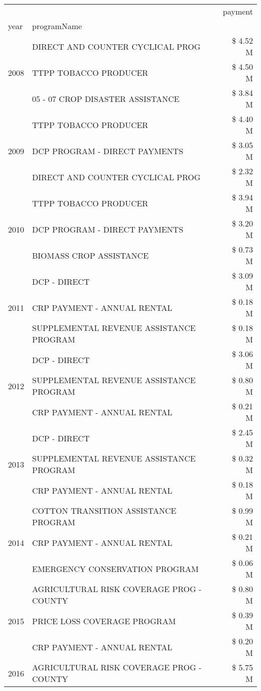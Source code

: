 \begin{tabular}{llr}
\toprule
 &  & payment \\
year & programName &  \\
\midrule
\multirow[t]{3}{*}{2008} & DIRECT AND COUNTER CYCLICAL PROG & \$ 4.52 M \\
 & TTPP TOBACCO PRODUCER & \$ 4.50 M \\
 & 05 - 07 CROP DISASTER ASSISTANCE & \$ 3.84 M \\
\cline{1-3}
\multirow[t]{3}{*}{2009} & TTPP TOBACCO PRODUCER & \$ 4.40 M \\
 & DCP PROGRAM - DIRECT PAYMENTS & \$ 3.05 M \\
 & DIRECT AND COUNTER CYCLICAL PROG & \$ 2.32 M \\
\cline{1-3}
\multirow[t]{3}{*}{2010} & TTPP TOBACCO PRODUCER & \$ 3.94 M \\
 & DCP PROGRAM - DIRECT PAYMENTS & \$ 3.20 M \\
 & BIOMASS CROP ASSISTANCE & \$ 0.73 M \\
\cline{1-3}
\multirow[t]{3}{*}{2011} & DCP - DIRECT & \$ 3.09 M \\
 & CRP PAYMENT - ANNUAL RENTAL & \$ 0.18 M \\
 & SUPPLEMENTAL REVENUE ASSISTANCE PROGRAM & \$ 0.18 M \\
\cline{1-3}
\multirow[t]{3}{*}{2012} & DCP - DIRECT & \$ 3.06 M \\
 & SUPPLEMENTAL REVENUE ASSISTANCE PROGRAM & \$ 0.80 M \\
 & CRP PAYMENT - ANNUAL RENTAL & \$ 0.21 M \\
\cline{1-3}
\multirow[t]{3}{*}{2013} & DCP - DIRECT & \$ 2.45 M \\
 & SUPPLEMENTAL REVENUE ASSISTANCE PROGRAM & \$ 0.32 M \\
 & CRP PAYMENT - ANNUAL RENTAL & \$ 0.18 M \\
\cline{1-3}
\multirow[t]{3}{*}{2014} & COTTON TRANSITION ASSISTANCE PROGRAM & \$ 0.99 M \\
 & CRP PAYMENT - ANNUAL RENTAL & \$ 0.21 M \\
 & EMERGENCY CONSERVATION PROGRAM & \$ 0.06 M \\
\cline{1-3}
\multirow[t]{3}{*}{2015} & AGRICULTURAL RISK COVERAGE PROG - COUNTY & \$ 0.80 M \\
 & PRICE LOSS COVERAGE PROGRAM & \$ 0.39 M \\
 & CRP PAYMENT - ANNUAL RENTAL & \$ 0.20 M \\
\cline{1-3}
\multirow[t]{3}{*}{2016} & AGRICULTURAL RISK COVERAGE PROG - COUNTY & \$ 5.75 M \\

\end{tabular}
